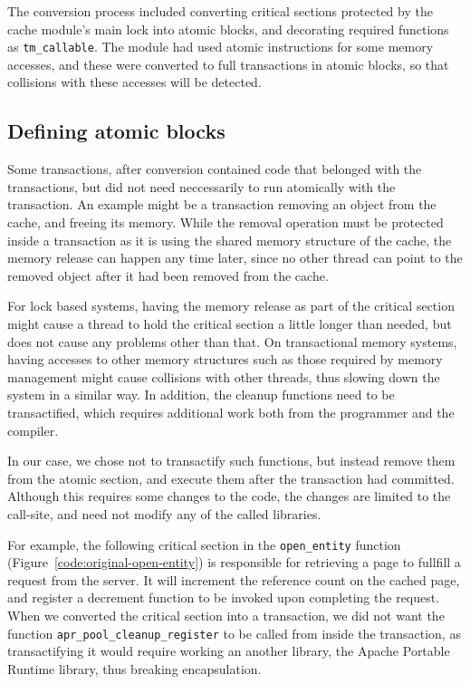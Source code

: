 \documentclass[preprint,11pt]{sigplanconf}
\begin{document}
The conversion process included converting critical sections protected by the
cache module's main lock into atomic blocks, and decorating required functions
as {\tt tm\_callable}. The module had used atomic instructions for some memory
accesses, and these were converted to full transactions in atomic blocks, so
that collisions with these accesses will be detected.

\subsection{Defining atomic blocks}
Some transactions, after conversion contained code that belonged with the
transactions, but did not need neccessarily to run atomically with the
transaction. An example might be a transaction removing an object from the
cache, and freeing its memory. While the removal operation must be protected
inside a transaction as it is using the shared memory structure of the cache,
the memory release can happen any time later, since no other thread can point to
the removed object after it had been removed from the cache. 

For lock based systems, having the memory release as part of the critical
section might cause a thread to hold the critical section a little longer than
needed, but does not cause any problems other than that. On transactional memory
systems, having accesses to other memory structures such as those required by
memory management might cause collisions with other threads, thus slowing down
the system in a similar way. In addition, the cleanup functions need to be
transactified, which requires additional work both from the programmer and the
compiler.

In our case, we chose not to transactify such functions, but instead remove them
from the atomic section, and execute them after the transaction had committed.
Although this requires some changes to the code, the changes are limited to the
call-site, and need not modify any of the called libraries.

For example, the following critical section in the {\tt open\_entity} function
(Figure~\ref{code:original-open-entity}) is responsible for retrieving a page
to fullfill a request from the server. It will increment the reference count on
the cached page, and register a decrement function to be invoked upon completing
the request. When we converted the critical section into a transaction, we
did not want the function {\tt apr\_pool\_cleanup\_register} to be called from
inside the transaction, as transactifying it would require working an another
library, the Apache Portable Runtime library, thus breaking encapsulation.
\end{document}
